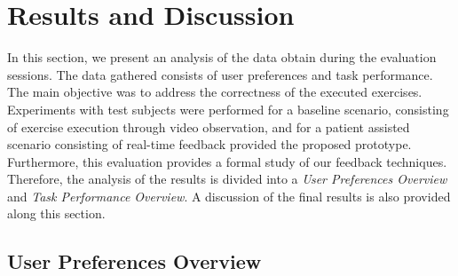 \section{Results and Discussion}
\label{sec:results}

In this section, we present an analysis of the data obtain during the evaluation sessions.
The data gathered consists of user preferences and task performance.
The main objective was to address the correctness of the executed exercises. 
Experiments with test subjects were performed for a baseline scenario, consisting of exercise execution through video observation, and for a patient assisted scenario consisting of real-time feedback provided the proposed prototype. 
Furthermore, this evaluation provides a formal study of our feedback techniques.
Therefore, the analysis of the results is divided into a {\it User Preferences Overview} and {\it Task Performance Overview}. 
A discussion of the final results is also provided along this section.

\subsection{User Preferences Overview}

